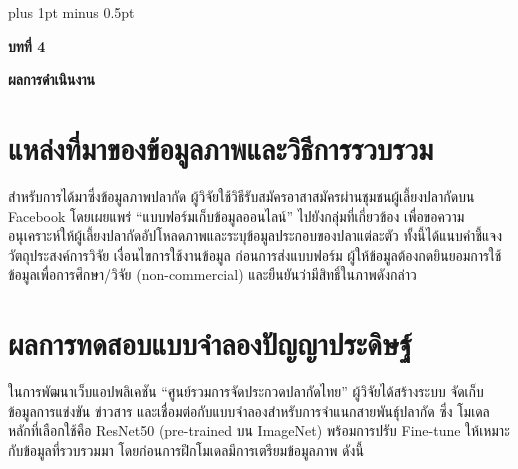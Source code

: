 
\clearpage
\thispagestyle{empty}

\begingroup
\fontsize{16pt}{19.2pt}\selectfont
\justifying
\XeTeXlinebreakskip=0pt plus 1pt minus 0.5pt
\setlength{\parindent}{1.5cm}
\setlength{\parskip}{0pt}

{}
\begin{center}
	{\bfseries\fontsize{18pt}{21.6pt}\selectfont บทที่ 4}
\end{center}

\vspace{\baselineskip}

\begin{center}
	{\bfseries\fontsize{18pt}{21.6pt}\selectfont ผลการดำเนินงาน}
\end{center}

\vspace{\baselineskip}

\section*{แหล่งที่มาของข้อมูลภาพและวิธีการรวบรวม}

\indent สำหรับการได้มาซึ่งข้อมูลภาพปลากัด ผู้วิจัยใช้วิธีรับสมัครอาสาสมัครผ่านชุมชนผู้เลี้ยงปลากัดบน Facebook โดยเผยแพร่ “แบบฟอร์มเก็บข้อมูลออนไลน์” ไปยังกลุ่มที่เกี่ยวข้อง เพื่อขอความอนุเคราะห์ให้ผู้เลี้ยงปลากัดอัปโหลดภาพและระบุข้อมูลประกอบของปลาแต่ละตัว ทั้งนี้ได้แนบคำชี้แจงวัตถุประสงค์การวิจัย เงื่อนไขการใช้งานข้อมูล ก่อนการส่งแบบฟอร์ม ผู้ให้ข้อมูลต้องกดยินยอมการใช้ข้อมูลเพื่อการศึกษา/วิจัย (non-commercial) และยืนยันว่ามีสิทธิ์ในภาพดังกล่าว


\section*{ผลการทดสอบแบบจำลองปัญญาประดิษฐ์}

\indent ในการพัฒนาเว็บแอปพลิเคชัน “ศูนย์รวมการจัดประกวดปลากัดไทย” ผู้วิจัยได้สร้างระบบ
จัดเก็บข้อมูลการแข่งขัน ข่าวสาร และเชื่อมต่อกับแบบจำลองสำหรับการจำแนกสายพันธุ์ปลากัด ซึ่ง
โมเดลหลักที่เลือกใช้คือ ResNet50 (pre-trained บน ImageNet) พร้อมการปรับ Fine-tune
ให้เหมาะกับข้อมูลที่รวบรวมมา โดยก่อนการฝึกโมเดลมีการเตรียมข้อมูลภาพ ดังนี้


